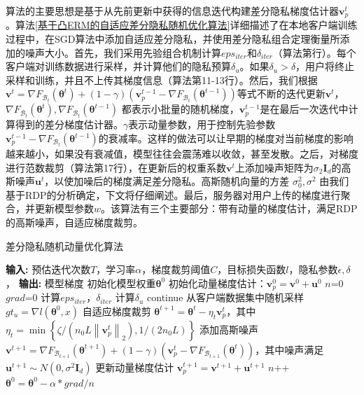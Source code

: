 算法的主要思想是基于从先前更新中获得的信息迭代构建差分隐私梯度估计器$\mathbf{v}_{p}^{t}$。算法\ref{基于凸ERM的自适应差分隐私随机优化算法}详细描述了在本地客户端训练过程中，在SGD算法中添加自适应差分隐私，并使用差分隐私组合定理衡量所添加的噪声大小。首先，我们采用先验组合机制计算$eps_{iter}$和$\delta_{iter}$（算法第行）。每个客户端对训练数据进行采样，并计算他们的隐私预算$\delta_{u}$。如果$\delta_{u}>\delta$，用户将终止采样和训练，并且不上传其梯度信息（算法第11-13行）。然后，我们根据$\mathbf{v}^{t}=\nabla F_{\mathcal{B}_{t}}\left(\boldsymbol{\theta}^{t}\right)+(1-\gamma)\left(\mathbf{v}_{p}^{t-1}-\nabla F_{\mathcal{B}_{t}}\left(\boldsymbol{\theta}^{t-1}\right)\right)$等式不断的迭代更新$\mathbf{v}^{t}$，$\nabla F_{\mathcal{B}_{t}}\left(\boldsymbol{\theta}^{t}\right), \nabla F_{\mathcal{B}_{t}}\left(\boldsymbol{\theta}^{t-1}\right)$ 都表示小批量的随机梯度，$\mathbf{v}_{p}^{t-1}$是在最后一次迭代中计算得到的差分梯度估计器。$\gamma$表示动量参数，用于控制先验参数$\mathbf{v}_{p}^{t-1}-\nabla F_{\mathcal{B}_{t}}\left(\boldsymbol{\theta}^{t-1}\right)$的衰减率。这样的做法可以让早期的梯度对当前梯度的影响越来越小，如果没有衰减值，模型往往会震荡难以收敛，甚至发散。之后，对梯度进行范数裁剪（算法第17行），在更新后的权重系数$\mathbf{v}^{t}$上添加噪声矩阵为$\sigma_{2} \mathbf{I}_{d}$的高斯噪声$\mathbf{u}^{t}$，以使加噪后的梯度满足差分隐私。高斯随机向量的方差 $\sigma_{0}^{2}, \sigma^{2}$ 由我们基于RDP的分析确定，下文将仔细阐述。最后，服务器对用户上传的梯度进行聚合，并更新模型参数$w$。该算法有三个主要部分：带有动量的梯度估计，满足RDP的高斯噪声，自适应梯度裁剪。

\begin{algorithm}[!htb]
	\caption{差分隐私随机动量优化算法}
	\label{基于凸ERM的自适应差分隐私随机优化算法}{}
	\begin{algorithmic}[1]
		\footnotesize
		\STATE \textbf{输入:} 预估迭代次数$T$，学习率$\alpha$，梯度裁剪阈值$C$，目标损失函数$l$，隐私参数$\epsilon, \delta$，
		\STATE \textbf{输出:} 模型梯度
		\STATE 初始化模型权重$\boldsymbol{\theta}^{0}$
		\STATE 初始化动量梯度估计：$\mathbf{v}_{p}^{0}=\mathbf{v}^{0}+\mathbf{u}^{0}$
			\STATE $n$=0
			\STATE $grad$=0
			\STATE 计算$eps_{iter}$，$\delta_{iter}$
				\STATE 计算$\delta_{u}$
					\STATE continue
				\ENDIF
				\STATE 从客户端数据集中随机采样
				\STATE $g t_{u}=\nabla l(\boldsymbol{\theta}^{0}, x)$
				\STATE 自适应梯度裁剪
				\STATE $\boldsymbol{\theta}^{t+1}=\boldsymbol{\theta}^{t}-\eta_{t} \mathbf{v}_{p}^{t}$，其中$\eta_{t}=\min \left\{\zeta /\left(n_{0} L\left\|\mathbf{v}_{p}^{t}\right\|_{2}\right), 1 /\left(2 n_{0} L\right)\right\}$
				\STATE 添加高斯噪声
				\STATE $\mathbf{v}^{t+1}=\nabla F_{\mathcal{B}_{t+1}}\left(\boldsymbol{\theta}^{t+1}\right)+(1-\gamma)\left(\mathbf{v}_{p}^{t}-\nabla F_{\mathcal{B}_{t+1}}\left(\boldsymbol{\theta}^{t}\right)\right)$，其中噪声满足$\mathbf{u}^{t+1} \sim N\left(0, \sigma^{2} \mathbf{I}_{d}\right)$
				\STATE 更新动量梯度估计
				\STATE $\mathbf{v}_{p}^{t+1}=\mathbf{v}^{t+1}+\mathbf{u}^{t+1}$
				\STATE $n$++
			\ENDFOR
			\STATE $\boldsymbol{\theta}^{0}=\boldsymbol{\theta}^{0}-\alpha * g r a d / n$
		\ENDWHILE
	\end{algorithmic}
\end{algorithm}

